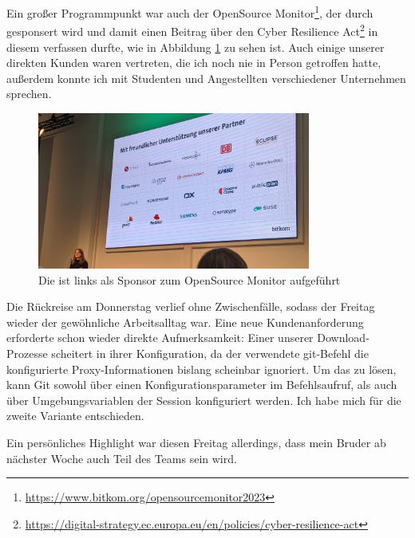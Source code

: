Ein großer Programmpunkt war auch der {\bitkom} OpenSource Monitor\footnote{\url{https://www.bitkom.org/opensourcemonitor2023}}, der durch {\metaeffekt} gesponsert wird und damit einen Beitrag über den Cyber Resilience Act\footnote{\url{https://digital-strategy.ec.europa.eu/en/policies/cyber-resilience-act}} in diesem verfassen durfte, wie in Abbildung \ref{fig:foss23-sponsor-metaeffekt} zu sehen ist.
Auch einige unserer direkten Kunden waren vertreten, die ich noch nie in Person getroffen hatte, außerdem konnte ich mit Studenten und Angestellten verschiedener Unternehmen sprechen.

\begin{figure}[htbp] %
    \centering
    \includegraphics[width=0.8\textwidth, keepaspectratio]{res/img/2023-10-19-ak-os-metaeffekt-sponsor}
    \caption{Die {\metaeffekt} ist links als Sponsor zum OpenSource Monitor aufgeführt}
    \label{fig:foss23-sponsor-metaeffekt}
\end{figure}

\sweekdaymarginpar{\weekdayThursdayShort, \weekdayFridayShort}

Die Rückreise am Donnerstag verlief ohne Zwischenfälle, sodass der Freitag wieder der gewöhnliche Arbeitsalltag war.
Eine neue Kundenanforderung erforderte schon wieder direkte Aufmerksamkeit:
Einer unserer Download-Prozesse scheitert in ihrer Konfiguration, da der verwendete git-Befehl die konfigurierte Proxy-Informationen bislang scheinbar ignoriert.
Um das zu lösen, kann Git sowohl über einen Konfigurationsparameter im Befehlsaufruf, als auch über Umgebungsvariablen der Session konfiguriert werden.
Ich habe mich für die zweite Variante entschieden.

Ein persönliches Highlight war diesen Freitag allerdings, dass mein Bruder ab nächster Woche auch Teil des {\metaeffekt} Teams sein wird.
